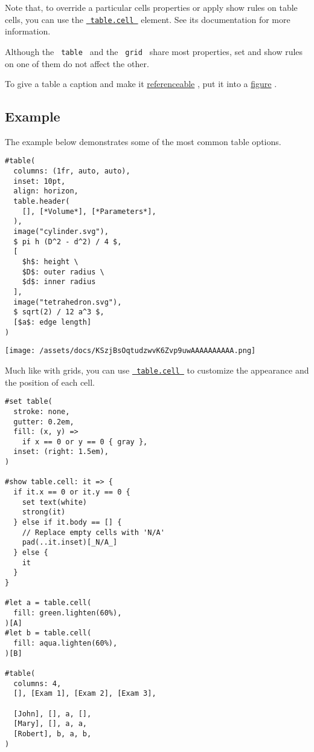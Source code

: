 Note that, to override a particular cell\textquotesingle s properties or
apply show rules on table cells, you can use the
\href{/docs/reference/model/table/\#definitions-cell}{\texttt{\ table.cell\ }}
element. See its documentation for more information.

Although the \texttt{\ table\ } and the \texttt{\ grid\ } share most
properties, set and show rules on one of them do not affect the other.

To give a table a caption and make it
\href{/docs/reference/model/ref/}{referenceable} , put it into a
\href{/docs/reference/model/figure/}{figure} .

\subsection{Example}\label{example}

The example below demonstrates some of the most common table options.

\begin{verbatim}
#table(
  columns: (1fr, auto, auto),
  inset: 10pt,
  align: horizon,
  table.header(
    [], [*Volume*], [*Parameters*],
  ),
  image("cylinder.svg"),
  $ pi h (D^2 - d^2) / 4 $,
  [
    $h$: height \
    $D$: outer radius \
    $d$: inner radius
  ],
  image("tetrahedron.svg"),
  $ sqrt(2) / 12 a^3 $,
  [$a$: edge length]
)
\end{verbatim}

\texttt{[image: /assets/docs/KSzjBsOqtudzwvK6Zvp9uwAAAAAAAAAA.png]}

Much like with grids, you can use
\href{/docs/reference/model/table/\#definitions-cell}{\texttt{\ table.cell\ }}
to customize the appearance and the position of each cell.

\begin{verbatim}
#set table(
  stroke: none,
  gutter: 0.2em,
  fill: (x, y) =>
    if x == 0 or y == 0 { gray },
  inset: (right: 1.5em),
)

#show table.cell: it => {
  if it.x == 0 or it.y == 0 {
    set text(white)
    strong(it)
  } else if it.body == [] {
    // Replace empty cells with 'N/A'
    pad(..it.inset)[_N/A_]
  } else {
    it
  }
}

#let a = table.cell(
  fill: green.lighten(60%),
)[A]
#let b = table.cell(
  fill: aqua.lighten(60%),
)[B]

#table(
  columns: 4,
  [], [Exam 1], [Exam 2], [Exam 3],

  [John], [], a, [],
  [Mary], [], a, a,
  [Robert], b, a, b,
)
\end{verbatim}

